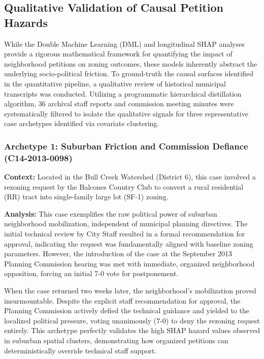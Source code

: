 \subsection{Qualitative Validation of Causal Petition Hazards}
\label{app:qualitative_case_studies}

\noindent While the Double Machine Learning (DML) and longitudinal SHAP analyses provide a rigorous mathematical framework for quantifying the impact of neighborhood petitions on zoning outcomes, these models inherently abstract the underlying socio-political friction. To ground-truth the causal surfaces identified in the quantitative pipeline, a qualitative review of historical municipal transcripts was conducted. Utilizing a programmatic hierarchical distillation algorithm, 36 archival staff reports and commission meeting minutes were systematically filtered to isolate the qualitative signals for three representative case archetypes identified via covariate clustering.

\subsubsection{Archetype 1: Suburban Friction and Commission Defiance (C14-2013-0098)}
\textbf{Context:} Located in the Bull Creek Watershed (District 6), this case involved a rezoning request by the Balcones Country Club to convert a rural residential (RR) tract into single-family large lot (SF-1) zoning. 

\textbf{Analysis:} This case exemplifies the raw political power of suburban neighborhood mobilization, independent of municipal planning directives. The initial technical review by City Staff resulted in a formal recommendation for approval, indicating the request was fundamentally aligned with baseline zoning parameters. However, the introduction of the case at the September 2013 Planning Commission hearing was met with immediate, organized neighborhood opposition, forcing an initial 7-0 vote for postponement. 

When the case returned two weeks later, the neighborhood's mobilization proved insurmountable. Despite the explicit staff recommendation for approval, the Planning Commission actively defied the technical guidance and yielded to the localized political pressure, voting unanimously (7-0) to deny the rezoning request entirely. This archetype perfectly validates the high SHAP hazard values observed in suburban spatial clusters, demonstrating how organized petitions can deterministically override technical staff support.

